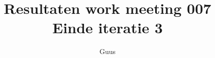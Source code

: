 \documentclass[a4paper,final]{article}
\title{Resultaten work meeting 007 Einde iteratie 3 }
\author{Guus}
\begin{document}

\newcommand{\Noc}{\textsc{NoC}\xspace}%
\newcommand{\w}[1]{\textsc{#1}\xspace}%
\newcommand{\qml}{\textsc{Qml}\xspace}%
\newcommand{\qt}{\textsc{Qt}\xspace}%
\newcommand{\qtquick}{\textsc{QtQuick}\xspace}%
\newcommand{\cpp}{\textsc{C++}\xspace}%
\newcommand{\code}[1]{\texttt{#1}\xspace}%
\newcommand{\xmas}{\textsc{xmas}\xspace}%
\newcommand{\xmv}{\textsc{Xmv}\xspace}%
\newcommand{\xmd}{\textsc{Xmd}\xspace}%
\newcommand{\xmvtest}{\textsc{XmvTest}\xspace}%
\newcommand{\xmdtest}{\textsc{XmdTest}\xspace}%
\newcommand{\bitpowder}{\textsc{Bitpowder}\xspace}%
\newcommand{\datamodel}{\textsc{datamodel}\xspace}%
\newcommand{\vt}{\textsc{Vt}\xspace}%
\newcommand{\src}{\textsc{src}\xspace}%
\newcommand{\agilefant}{\textsc{AgileFant}\xspace}%
\newcommand{\een}{\'{e}\'{e}n\xspace}%
\newcommand{\svn}{\textsc{svn}\xspace}%
\end{document}
